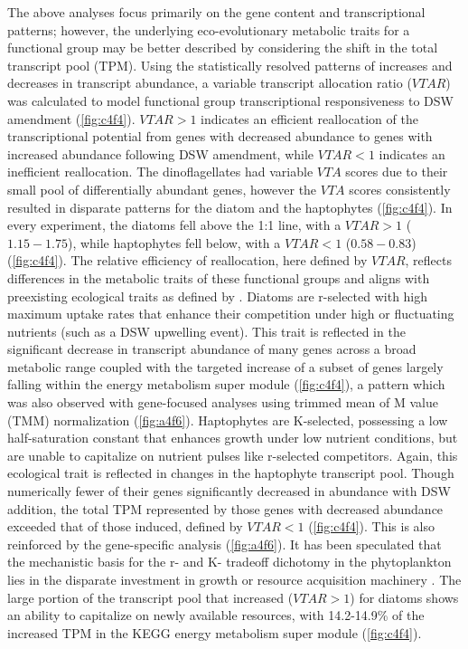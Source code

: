 The above analyses focus primarily on the gene content and transcriptional patterns; however, the underlying eco-evolutionary metabolic traits for a functional group may be better described by considering the shift in the total transcript pool (TPM). Using the statistically resolved patterns of increases and decreases in transcript abundance, a variable transcript allocation ratio ($VTAR$) was calculated to model functional group transcriptional responsiveness to DSW amendment (\cref{fig:c4f4}). $VTAR > 1$ indicates an efficient reallocation of the transcriptional potential from genes with decreased abundance to genes with increased abundance following DSW amendment, while $VTAR < 1$ indicates an inefficient reallocation. The dinoflagellates had variable $VTA$ scores due to their small pool of differentially abundant genes, however the $VTA$ scores consistently resulted in disparate patterns for the diatom and the haptophytes (\cref{fig:c4f4}). In every experiment, the diatoms fell above the 1:1 line, with a $VTAR > 1$ ($1.15 - 1.75$), while haptophytes fell below, with a $VTAR < 1$ ($0.58 - 0.83$) (\cref{fig:c4f4}). The relative efficiency of reallocation, here defined by $VTAR$, reflects differences in the metabolic traits of these functional groups and aligns with preexisting ecological traits as defined by \citep{Margalef1978}. Diatoms are r-selected with high maximum uptake rates that enhance their competition under high or fluctuating nutrients (such as a DSW upwelling event). This trait is reflected in the significant decrease in transcript abundance of many genes across a broad metabolic range coupled with the targeted increase of a subset of genes largely falling within the energy metabolism super module (\cref{fig:c4f4}), a pattern which was also observed with gene-focused analyses using trimmed mean of M value (TMM) normalization \citep{Marchetti2012a, Robinson2010} (\cref{fig:a4f6}). Haptophytes are K-selected, possessing a low half-saturation constant that enhances growth under low nutrient conditions, but are unable to capitalize on nutrient pulses like r-selected competitors. Again, this ecological trait is reflected in changes in the haptophyte transcript pool. Though numerically fewer of their genes significantly decreased in abundance with DSW addition, the total TPM represented by those genes with decreased abundance exceeded that of those induced, defined by $VTAR <1$ (\cref{fig:c4f4}). This is also reinforced by the gene-specific analysis (\cref{fig:a4f6}). It has been speculated that the mechanistic basis for the r- and K- tradeoff dichotomy in the phytoplankton lies in the disparate investment in growth or resource acquisition machinery \citep{Litchman2008}. The large portion of the transcript pool that increased ($VTAR > 1$) for diatoms shows an ability to capitalize on newly available resources, with 14.2-14.9\% of the increased TPM in the KEGG energy metabolism super module (\cref{fig:c4f4}). 
